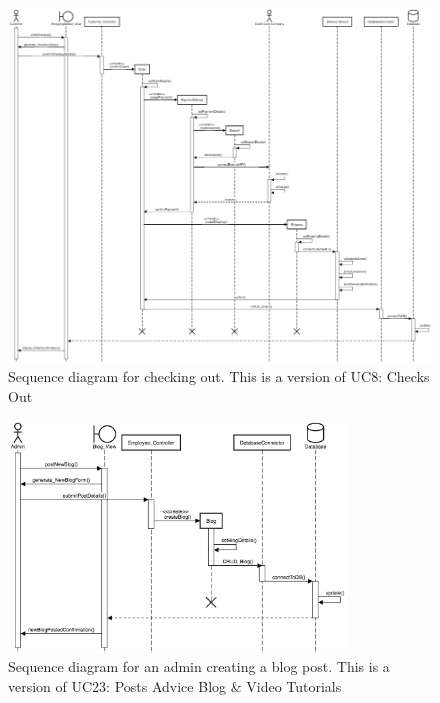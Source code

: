 \begin{figure}[H]
      \centering
      \includegraphics[trim = 0 0 0 0, clip, width=1.1\textwidth]{TempImg/check_out_SD.png}
      \caption{Sequence diagram for checking out. This is a version of UC8: Checks Out}
\end{figure}

\begin{figure}[H]
      \centering
      \includegraphics[trim = 0 0 0 0, clip, width=0.8\textwidth]{TempImg/make_blog_post_SD.png}
      \caption{Sequence diagram for an admin creating a blog post. This is a version of UC23: Posts Advice Blog & Video Tutorials}
\end{figure}

